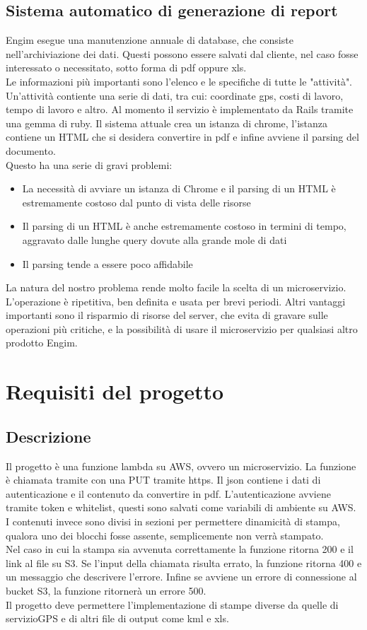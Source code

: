 \documentclass[12pt]{article}
\begin{document}
\subsection{Sistema automatico di generazione di report}
Engim esegue una manutenzione annuale di database, che consiste nell'archiviazione
dei dati. Questi possono essere salvati dal cliente, nel caso fosse interessato 
o necessitato, sotto forma di pdf oppure xls.
\\ 
Le informazioni più importanti sono l'elenco e le specifiche di tutte le "attività". 
Un'attività contiente una serie di dati, tra cui: coordinate
gps, costi di lavoro, tempo di lavoro e altro.  
Al momento il servizio è implementato da Rails tramite una gemma di ruby. 
Il sistema attuale crea un istanza di chrome, l'istanza contiene un HTML
che si desidera convertire in pdf e infine avviene il parsing del documento.
\\ Questo ha una serie di gravi problemi:
\begin{itemize}
  \item La necessità di avviare un istanza di Chrome e il parsing di un HTML è
  estremamente costoso dal punto di vista delle risorse
  \item Il parsing di un HTML è anche estremamente costoso in termini di tempo,
  aggravato dalle lunghe query dovute alla grande mole di dati 
  \item Il  parsing tende a essere poco affidabile
\end{itemize}
La natura del nostro problema rende molto facile la scelta di un microservizio.
L'operazione è ripetitiva, ben definita e usata per brevi periodi. Altri vantaggi 
importanti sono il risparmio di risorse del server, che evita di gravare sulle 
operazioni più critiche, e la possibilità di usare il microservizio per qualsiasi 
altro prodotto Engim.


\section{Requisiti del progetto}
\subsection{Descrizione}
Il progetto è una funzione lambda su AWS, ovvero un microservizio. La funzione 
è chiamata tramite con una PUT tramite https. Il json contiene i dati 
di autenticazione e il contenuto da convertire in pdf. L'autenticazione avviene 
tramite token e whitelist, questi sono salvati come variabili di ambiente su AWS.
I contenuti invece sono divisi in sezioni per permettere dinamicità di stampa, 
qualora uno dei blocchi fosse assente, semplicemente non verrà stampato. 
\\ Nel caso in cui la stampa sia avvenuta correttamente la funzione ritorna 200 e 
il link al file su S3. Se l'input della chiamata risulta errato, la funzione ritorna 
400 e un messaggio che descrivere l'errore. Infine se avviene un errore di connessione 
al bucket S3, la funzione ritornerà un errore 500.    
\\ Il progetto deve permettere l'implementazione di stampe diverse da quelle di servizioGPS
e di altri file di output come kml e xls. 
\end{document}
